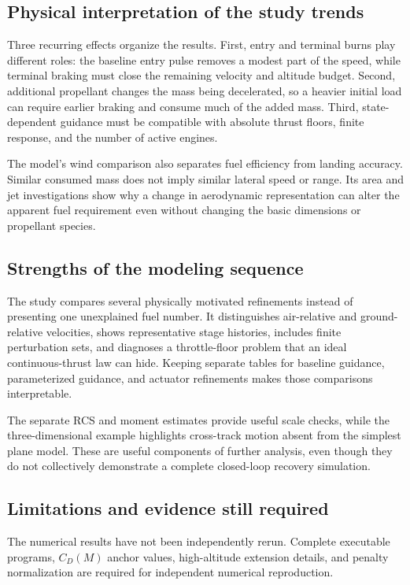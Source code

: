\documentclass[11pt,a4paper]{article}
\begin{document}
\subsection{Physical interpretation of the study trends}
Three recurring effects organize the results. First, entry and terminal burns play different roles: the baseline entry pulse removes a modest part of the speed, while terminal braking must close the remaining velocity and altitude budget. Second, additional propellant changes the mass being decelerated, so a heavier initial load can require earlier braking and consume much of the added mass. Third, state-dependent guidance must be compatible with absolute thrust floors, finite response, and the number of active engines.

The model's wind comparison also separates fuel efficiency from landing accuracy. Similar consumed mass does not imply similar lateral speed or range. Its area and jet investigations show why a change in aerodynamic representation can alter the apparent fuel requirement even without changing the basic dimensions or propellant species.

\subsection{Strengths of the modeling sequence}
The study compares several physically motivated refinements instead of presenting one unexplained fuel number. It distinguishes air-relative and ground-relative velocities, shows representative stage histories, includes finite perturbation sets, and diagnoses a throttle-floor problem that an ideal continuous-thrust law can hide. Keeping separate tables for baseline guidance, parameterized guidance, and actuator refinements makes those comparisons interpretable.

The separate RCS and moment estimates provide useful scale checks, while the three-dimensional example highlights cross-track motion absent from the simplest plane model. These are useful components of further analysis, even though they do not collectively demonstrate a complete closed-loop recovery simulation.

\subsection{Limitations and evidence still required}
The numerical results have not been independently rerun. Complete executable programs, $C_D(M)$ anchor values, high-altitude extension details, and penalty normalization are required for independent numerical reproduction.
\end{document}
